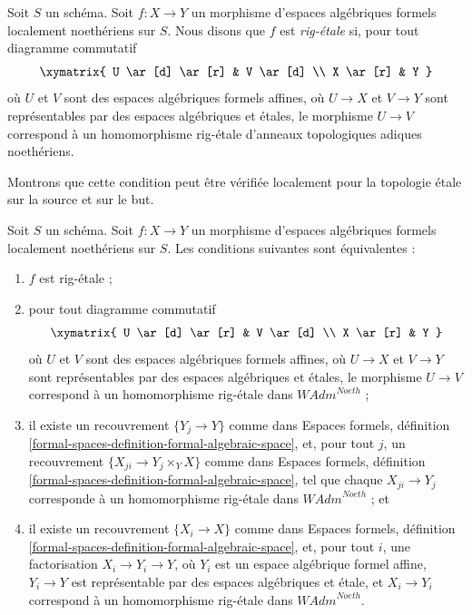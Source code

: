 \begin{definition}
\label{definition-rig-etale}
Soit $S$ un schéma. Soit $f : X \to Y$ un morphisme d'espaces algébriques
formels localement noethériens sur $S$. Nous disons que $f$ est
{\it rig-étale} si, pour tout diagramme commutatif
$$
\xymatrix{
U \ar[d] \ar[r] & V \ar[d] \\
X \ar[r] & Y
}
$$
où $U$ et $V$ sont des espaces algébriques formels affines, où $U \to X$ et $V \to Y$
sont représentables par des espaces algébriques et étales, le morphisme $U \to V$
correspond à un homomorphisme rig-étale d'anneaux topologiques adiques noethériens.
\end{definition}

\noindent
Montrons que cette condition peut être vérifiée localement pour la topologie
étale sur la source et sur le but.

\begin{lemma}
\label{lemma-rig-etale-morphisms}
Soit $S$ un schéma. Soit $f : X \to Y$ un morphisme d'espaces
algébriques formels localement noethériens sur $S$.
Les conditions suivantes sont équivalentes :
\begin{enumerate}
\item $f$ est rig-étale ;
\item pour tout diagramme commutatif
$$
\xymatrix{
U \ar[d] \ar[r] & V \ar[d] \\
X \ar[r] & Y
}
$$
où $U$ et $V$ sont des espaces algébriques formels affines, où $U \to X$ et $V \to Y$
sont représentables par des espaces algébriques et étales, le morphisme $U \to V$
correspond à un homomorphisme rig-étale dans $\textit{WAdm}^{Noeth}$ ;
\item il existe un recouvrement $\{Y_j \to Y\}$ comme dans
Espaces formels,
définition \ref{formal-spaces-definition-formal-algebraic-space},
et, pour tout $j$,
un recouvrement $\{X_{ji} \to Y_j \times_Y X\}$ comme dans
Espaces formels,
définition \ref{formal-spaces-definition-formal-algebraic-space},
tel que chaque $X_{ji} \to Y_j$ corresponde
à un homomorphisme rig-étale dans $\textit{WAdm}^{Noeth}$ ; et
\item il existe un recouvrement $\{X_i \to X\}$ comme dans
Espaces formels,
définition \ref{formal-spaces-definition-formal-algebraic-space},
et, pour tout $i$, une factorisation $X_i \to Y_i \to Y$, où $Y_i$
est un espace algébrique formel affine, $Y_i \to Y$ est représentable
par des espaces algébriques et étale, et $X_i \to Y_i$ correspond
à un homomorphisme rig-étale dans $\textit{WAdm}^{Noeth}$.
\end{enumerate}
\end{lemma}

